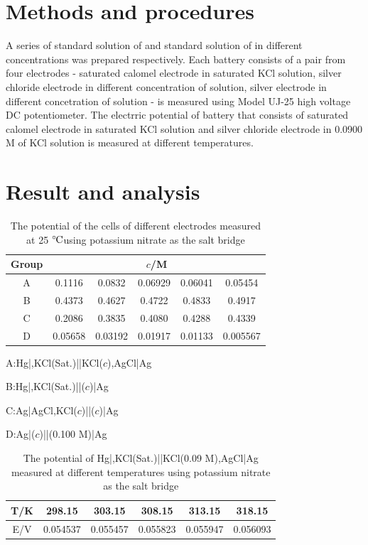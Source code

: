 \documentclass[%
 reprint,
 amsmath,amssymb,
 aps,
10.5pt,
]{revtex4-1}
\newcommand{\celsius}{\ensuremath{^\circ\hspace{-0.09em}\mathrm{C}}}
\begin{document}
\section{Methods and procedures}
A series of standard solution of  and standard solution of  in different concentrations was prepared respectively. Each battery consists of a pair from four electrodes - saturated calomel electrode in saturated KCl solution, silver chloride electrode in different concentration of  solution, silver electrode in different concetration of  solution - is measured using Model UJ-25 high voltage DC potentiometer. The electrric potential of battery that consists of saturated calomel electrode in saturated KCl solution and silver chloride electrode in 0.0900 M of KCl solution is measured at different temperatures. 

\section{Result and analysis}

\begin{table}
\centering
\caption{The potential of the cells of different electrodes measured at 25 \celsius using potassium nitrate as the salt bridge}
\begin{tabular}{c|ccccc}\hline
Group & \multicolumn{5}{c}{$c$/M} \\\hline
A &  0.1116 & 0.0832 & 0.06929 & 0.06041 & 0.05454 \\
B &   0.4373 & 0.4627 & 0.4722 & 0.4833 & 0.4917 \\
C &  0.2086 & 0.3835 & 0.4080 & 0.4288 & 0.4339 \\
D &  0.05658 & 0.03192 & 0.01917 & 0.01133 & 0.005567 \\\hline
\end{tabular}

\begin{flushleft}
A:Hg|,KCl(Sat.)||KCl($c$),AgCl|Ag

B:Hg|,KCl(Sat.)||($c$)|Ag

C:Ag|AgCl,KCl($c$)||($c$)|Ag

D:Ag|($c$)||(0.100 M)|Ag
\end{flushleft}
\label{table}
\end{table}


\begin{table}
\centering
\caption{The potential of Hg|,KCl(Sat.)||KCl(0.09 M),AgCl|Ag measured at different temperatures using potassium nitrate as the salt bridge}
\begin{tabular}{c|ccccc}\hline
T/K & 298.15 & 303.15 & 308.15 & 313.15 & 318.15  \\\hline
E/V & 0.054537 & 0.055457 & 0.055823 & 0.055947 & 0.056093 \\\hline
\end{tabular}
\label{table2}
\end{table}
\end{document}
